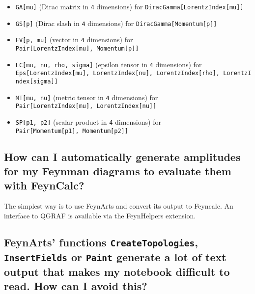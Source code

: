 \documentclass[../FeynCalcManual.tex]{subfiles}
\begin{document}
\begin{itemize}
\tightlist
\item
  \texttt{GA[\allowbreak{}mu]} (Dirac matrix in \texttt{4} dimensions)
  for \texttt{DiracGamma[\allowbreak{}LorentzIndex[\allowbreak{}mu]]}
\item
  \texttt{GS[\allowbreak{}p]} (Dirac slash in \texttt{4} dimensions) for
  \texttt{DiracGamma[\allowbreak{}Momentum[\allowbreak{}p]]}
\item
  \texttt{FV[\allowbreak{}p,\ \allowbreak{}mu]} (vector in \texttt{4}
  dimensions) for
  \texttt{Pair[\allowbreak{}LorentzIndex[\allowbreak{}mu],\ \allowbreak{}Momentum[\allowbreak{}p]]}
\item
  \texttt{LC[\allowbreak{}mu,\ \allowbreak{}nu,\ \allowbreak{}rho,\ \allowbreak{}sigma]}
  (epsilon tensor in \texttt{4} dimensions) for
  \texttt{Eps[\allowbreak{}LorentzIndex[\allowbreak{}mu],\ \allowbreak{}LorentzIndex[\allowbreak{}nu],\ \allowbreak{}LorentzIndex[\allowbreak{}rho],\ \allowbreak{}LorentzIndex[\allowbreak{}sigma]]}
\item
  \texttt{MT[\allowbreak{}mu,\ \allowbreak{}nu]} (metric tensor in
  \texttt{4} dimensions) for
  \texttt{Pair[\allowbreak{}LorentzIndex[\allowbreak{}mu],\ \allowbreak{}LorentzIndex[\allowbreak{}nu]]}
\item
  \texttt{SP[\allowbreak{}p1,\ \allowbreak{}p2]} (scalar product in
  \texttt{4} dimensions) for
  \texttt{Pair[\allowbreak{}Momentum[\allowbreak{}p1],\ \allowbreak{}Momentum[\allowbreak{}p2]]}
\end{itemize}

\hypertarget{how-can-i-automatically-generate-amplitudes-for-my-feynman-diagrams-to-evaluate-them-with-feyncalc}{%
\subsection{How can I automatically generate amplitudes for my Feynman
diagrams to evaluate them with
FeynCalc?}\label{how-can-i-automatically-generate-amplitudes-for-my-feynman-diagrams-to-evaluate-them-with-feyncalc}}

The simplest way is to use FeynArts and convert its output to Feyncalc.
An interface to QGRAF is available via the FeynHelpers extension.

\hypertarget{feynarts-functions-createtopologies-insertfields-or-paint-generate-a-lot-of-text-output-that-makes-my-notebook-difficult-to-read.-how-can-i-avoid-this}{%
\subsection{\texorpdfstring{FeynArts' functions
\texttt{CreateTopologies}, \texttt{InsertFields} or \texttt{Paint}
generate a lot of text output that makes my notebook difficult to read.
How can I avoid
this?}{FeynArts' functions ,  or  generate a lot of text output that makes my notebook difficult to read. How can I avoid this?}}\label{feynarts-functions-createtopologies-insertfields-or-paint-generate-a-lot-of-text-output-that-makes-my-notebook-difficult-to-read.-how-can-i-avoid-this}}
\end{document}
